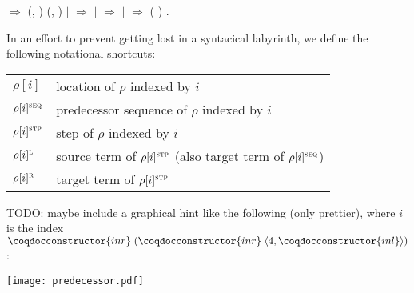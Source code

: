 \begin{singlespace}
\begin{coqdoccode}
\ensuremath{\Rightarrow}
\coqdocvar{\_} (, )
(\coqdocvariable{$\tau$}, \coqdocvariable{$\pi$})\coqdoceol
\coqdocindent{10.00em}
\ensuremath{|}
  \ensuremath{\Rightarrow}
 \coqdocvariable{$\tau$}
\coqdoceol
\coqdocindent{10.00em}
\coqdoceol
\coqdocindent{1.00em}
\ensuremath{|}  \coqdocvar{\_}
\coqdocvar{\_} \coqdocvar{\_}  \coqdocvar{\_}
\ensuremath{\Rightarrow}
  \coqdoceol
\coqdocindent{10.00em}
\ensuremath{|}
  \ensuremath{\Rightarrow}
 (
) \coqdoceol
\coqdocindent{10.00em}
\coqdoceol
\coqdocindent{1.00em}
.\coqdoceol
\end{coqdoccode}
\end{singlespace}

In an effort to prevent getting lost in a syntacical labyrinth, we define
the following notational shortcuts:

{\renewcommand{\arraystretch}{1.1}
\renewcommand{\tabcolsep}{10pt}
\begin{tabular}{ll}
$\rho[i]$ & location of $\rho$ indexed by $i$\\
$\rho[i]^\textsc{seq}$ & predecessor sequence of $\rho$ indexed by $i$\\
$\rho[i]^\textsc{stp}$ & step of $\rho$ indexed by $i$\\
$\rho[i]^\textsc{l}$ & source term of $\rho[i]^\textsc{stp}$ (also target term
  of $\rho[i]^\textsc{seq}$)\\
$\rho[i]^\textsc{r}$ & target term of $\rho[i]^\textsc{stp}$
\end{tabular}}

TODO: maybe include a graphical hint like the following (only prettier), where
$i$ is the index $\coqdocconstructor{inr} \; (\coqdocconstructor{inr} \;
\langle 4, \coqdocconstructor{inl}\rangle)$:

\texttt{[image: predecessor.pdf]}

